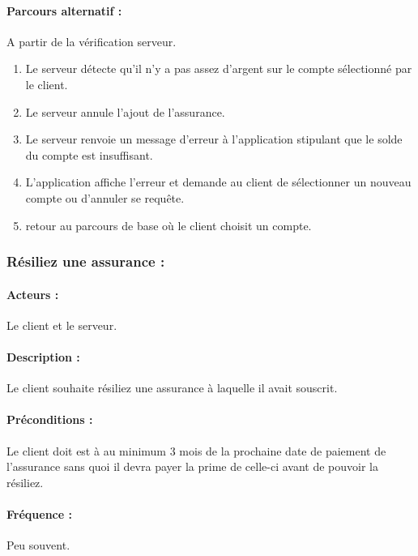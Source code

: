 \documentclass[../annexe.tex]{subfiles}
\begin{document}
\paragraph{Parcours alternatif :} A partir de la vérification serveur.
\begin{enumerate}
		\item Le serveur détecte qu'il n'y a pas assez d'argent sur le compte sélectionné par le client.
		\item Le serveur annule l'ajout de l'assurance.
		\item Le serveur renvoie un message d'erreur à l'application stipulant que le solde du compte est insuffisant.
		\item L'application affiche l'erreur et demande au client de sélectionner un nouveau compte ou d'annuler se requête.
		\item retour au parcours de base où le client choisit un compte.
\end{enumerate}
\newpage

\subsubsection{Résiliez une assurance :}

\paragraph{Acteurs :}
		Le client et le serveur.
\paragraph{Description :}
		Le client souhaite résiliez une assurance à laquelle il avait souscrit.
\paragraph{Préconditions :}
		Le client doit est à au minimum 3 mois de la prochaine date de paiement de l'assurance sans quoi il devra payer la prime de celle-ci avant de pouvoir la résiliez.
\paragraph{Fréquence :}
		Peu souvent.
\end{document}
